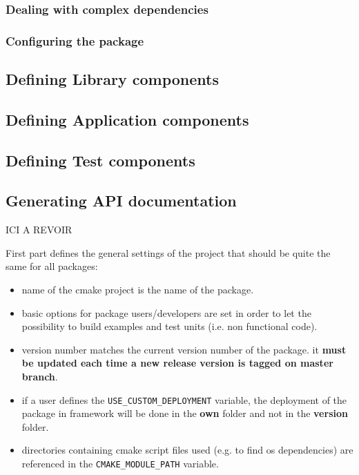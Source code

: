 \documentclass[12pt,a4paper]{article}
\begin{document}
\subsubsection{Dealing with complex dependencies}
\label{sec:rootCMakeComplexDeps}


\subsubsection{Configuring the package}
\label{sec:rootCMakeConfig}


\subsection{Defining Library components}
\label{sec:libCMake}

\subsection{Defining Application components}
\label{sec:appCMake}

\subsection{Defining Test components}
\label{sec:testCMake}

\subsection{Generating API documentation}
\label{sec:apiCMake}

ICI A REVOIR

First part defines the general settings of the project that should be quite the same for all packages:
\begin{itemize}
\item name of the cmake project is the name of the package.
\item basic options for package users/developers are set in order to let the possibility to build examples and test units (i.e. non functional code).
\item version number matches the current version number of the package. it \textbf{must be updated each time a new release version is tagged on master branch}.
\item if a user defines the \verb|USE_CUSTOM_DEPLOYMENT| variable, the deployment of the package in framework will be done in the \textbf{own} folder and not in the \textbf{version} folder.
\item directories containing cmake script files used (e.g. to find os dependencies) are referenced in the \verb|CMAKE_MODULE_PATH| variable. 
\end{itemize}
\end{document}
